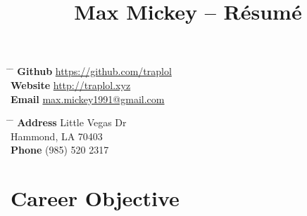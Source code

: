 \documentclass[10pt]{article} %
\begin{document}
\raggedright


\title{Max Mickey -- Résumé}


\parbox{0.5\textwidth}{ %
\begin{tabbing}
\hspace{2cm} \= \hspace{3cm} \= \kill 
\textbf {Github} \> \href{https://github.com/traplol}{https://github.com/traplol} \\
\textbf {Website} \> \href{http://traplol.xyz}{http://traplol.xyz} \\
\textbf {Email} \> \href{mailto:max.mickey1991@gmail.com}{max.mickey1991@gmail.com} \\
\end{tabbing}}
\hfill
\parbox{0.5\textwidth}{ %
\begin{tabbing}
\hspace{2cm} \= \hspace{3cm} \= \kill
\textbf {Address}  Little Vegas Dr\\ %
\> Hammond, LA 70403 \\ %
\textbf {Phone} \> (985) 520 2317 \\
\end{tabbing}}

\vspace{-10mm}
%
%
\section{Career Objective}
\vspace{-3mm}
\end{document}
